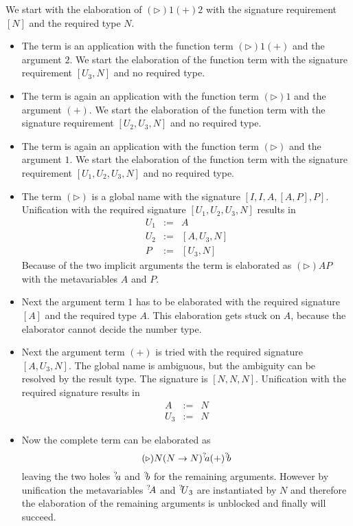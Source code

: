 We start with the elaboration of $(\triangleright) 1 (+) 2$ with the signature
requirement $[N]$ and the required type $N$.

\begin{itemize}
    \item The term is an application with the function term $(\triangleright) 1
        (+)$ and the argument $2$. We start the elaboration of the function term
        with the signature requirement $[U_3, N]$ and no required type.

    \item The term is again an application with the function term
        $(\triangleright) 1$ and the argument $(+)$. We start the elaboration
        of the function term with the signature requirement $[U_2, U_3, N]$ and
        no required type.

    \item The term is again an application with the function term
        $(\triangleright)$ and the argument $1$. We start the elaboration of the
        function term with the signature requirement $[U_1, U_2, U_3, N]$ and no
        required type.

    \item The term $(\triangleright)$ is a global name with the signature $[I,
        I, A, [A, P], P]$. Unification with the required signature $[U_1, U_2,
        U_3, N]$ results in
        $$
        \begin{array}{lll}
            U_1 &:=& A
            \\
            U_2 &:=& [A, U_3, N]
            \\
            P   &:=& [U_3, N]
        \end{array}
        $$
        Because of the two implicit arguments the term is elaborated as
        $(\triangleright)A P$ with the metavariables $A$ and $P$.

    \item Next the argument term $1$ has to be elaborated with the required
        signature $[A]$ and the required type $A$. This elaboration gets stuck
        on $A$, because the elaborator cannot decide the number type.

    \item Next the argument term $(+)$ is tried with the required signature $[A,
        U_3, N]$. The global name is ambiguous, but the ambiguity can be
        resolved by the result type. The signature is $[N, N, N]$. Unification
        with the required signature results in
        $$
        \begin{array}{lll}
            A &:=& N
            \\
            U_3 &:=& N
        \end{array}
        $$

    \item Now the complete term can be elaborated as
        $$
            (\triangleright) N (N \to N) {{}^? \kern-0.2em a} (+) {{}^? \kern-0.2em b}
        $$
        leaving the two holes ${{}^? \kern-0.2em a}$ and ${{}^? \kern-0.2em b}$ for the remaining
        arguments. However by unification the metavariables ${{}^? \kern-0.2em A}$ and ${{}^? \kern-0.2em U}_3$ are instantiated by $N$ and therefore the elaboration of the
        remaining arguments is unblocked and finally will succeed.
\end{itemize}
